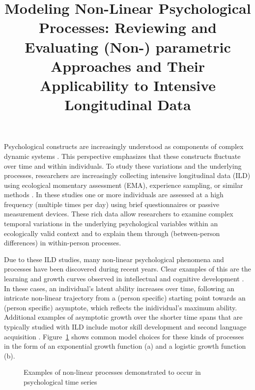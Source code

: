 \documentclass[man, floatsintext]{apa7}
\title{Modeling Non-Linear Psychological Processes: Reviewing and Evaluating
  (Non-) parametric Approaches and Their Applicability to Intensive
  Longitudinal Data}
\begin{document}
\maketitle

Psychological constructs are increasingly understood as components of complex
dynamic systems \parencite{nesselroade_studying_2004, wang_investigating_2012}.
This perspective emphasizes that these constructs fluctuate over time and
within individuals. To study these variations and the underlying processes,
researchers are increasingly collecting intensive longitudinal data (ILD) using
ecological momentary assessment (EMA), experience sampling, or similar methods
\parencite{fritz_so_2023}. In these studies one or more individuals are
assessed at a high frequency (multiple times per day) using brief
questionnaires or passive measurement devices. These rich data allow
researchers to examine complex temporal variations in the underlying
psychological variables within an ecologically valid context and to explain
them through (between-person differences) in within-person processes.

Due to these ILD studies, many non-linear psychological phenomena and processes
have been discovered during recent years. Clear examples of this are the
learning and growth curves observed in intellectual and cognitive development
\parencite{kunnen_dynamic_2012, mcardle_comparative_2002}. In these cases, an
individual's latent ability increases over time, following an intricate
non-linear trajectory from a (person specific) starting point towards an
(person specific) asymptote, which reflects the inidividual's maximum ability.
Additional examples of asymptotic growth over the shorter time spans that are
typically studied with ILD include motor skill development
\parencite{newell_time_2001} and second language acquisition
\parencite{de_bot_dynamic_2007}. Figure~\ref{fig:examplar_npn} shows
common model choices for these kinds of processes in the form of an
exponential growth function (a) and a logistic growth function (b).

\begin{figure}[!t]
  \caption{Examples of non-linear processes demonstrated to occur in
    psychological time series}
  \label{fig:examplar_npn}
\end{figure}
\end{document}
